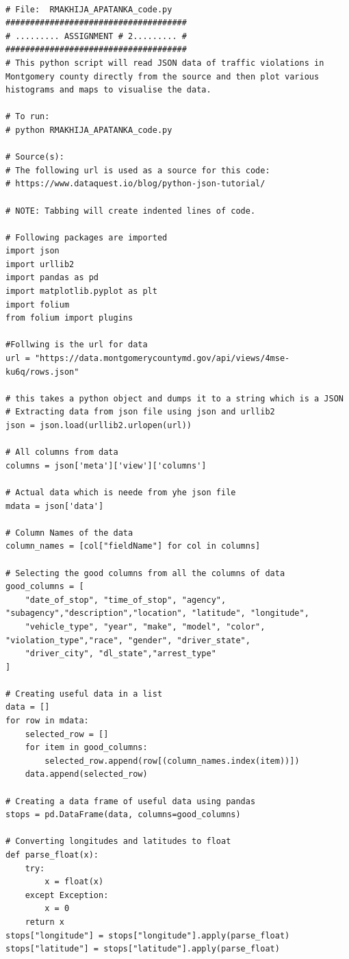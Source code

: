 \documentclass[11pt,oneside]{article}
\begin{document}
\begin{lstlisting}[frame=l, name=Traffic Violations, title={Code for visualization of Traffic violations in Montgomery County}] 

# File:  RMAKHIJA_APATANKA_code.py
#####################################
# ......... ASSIGNMENT # 2......... #
#####################################
# This python script will read JSON data of traffic violations in Montgomery county directly from the source and then plot various histograms and maps to visualise the data.

# To run:
# python RMAKHIJA_APATANKA_code.py

# Source(s):
# The following url is used as a source for this code:
# https://www.dataquest.io/blog/python-json-tutorial/

# NOTE: Tabbing will create indented lines of code.

# Following packages are imported
import json
import urllib2
import pandas as pd
import matplotlib.pyplot as plt
import folium
from folium import plugins

#Follwing is the url for data
url = "https://data.montgomerycountymd.gov/api/views/4mse-ku6q/rows.json"

# this takes a python object and dumps it to a string which is a JSON
# Extracting data from json file using json and urllib2
json = json.load(urllib2.urlopen(url))

# All columns from data
columns = json['meta']['view']['columns']

# Actual data which is neede from yhe json file
mdata = json['data']

# Column Names of the data
column_names = [col["fieldName"] for col in columns]

# Selecting the good columns from all the columns of data
good_columns = [
    "date_of_stop", "time_of_stop", "agency", "subagency","description","location", "latitude", "longitude",
    "vehicle_type", "year", "make", "model", "color", "violation_type","race", "gender", "driver_state",
    "driver_city", "dl_state","arrest_type"
]

# Creating useful data in a list
data = []
for row in mdata:
    selected_row = []
    for item in good_columns:
        selected_row.append(row[(column_names.index(item))])
    data.append(selected_row)

# Creating a data frame of useful data using pandas
stops = pd.DataFrame(data, columns=good_columns)

# Converting longitudes and latitudes to float
def parse_float(x):
    try:
        x = float(x)
    except Exception:
        x = 0
    return x
stops["longitude"] = stops["longitude"].apply(parse_float)
stops["latitude"] = stops["latitude"].apply(parse_float)


\end{lstlisting}
\end{document}
